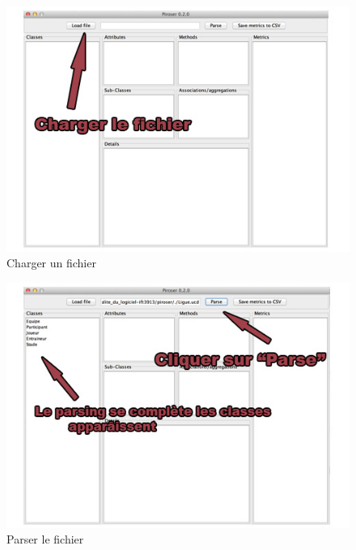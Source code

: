 \documentclass[12pt]{article}
\begin{document}
\begin{figure}
\includegraphics[width=\textwidth]{load_file.jpg}
\caption{\label{fig:load_file}Charger un fichier}
\end{figure}

\begin{figure}
\includegraphics[width=\textwidth]{parsing.jpg}
\caption{\label{fig:parse}Parser le fichier}
\end{figure}
\end{document}
